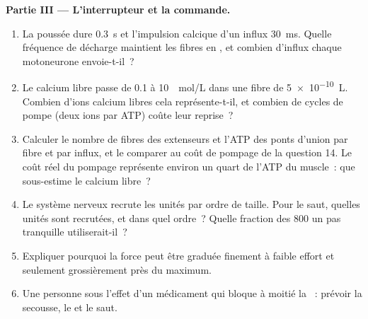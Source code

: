 \begin{problem}
\medskip
\noindent\textbf{Partie III --- L'interrupteur et la commande.}
\begin{enumerate}[resume]
  \item La poussée dure \qty{0.3}{s} et l'impulsion calcique d'un influx
        \qty{30}{ms}. Quelle fréquence de décharge maintient les fibres en
        , et combien d'influx chaque motoneurone envoie-t-il~?
  \item Le calcium libre passe de \qty{0.1}{} à \qty{10}{\micro
        mol/L} dans une fibre de \qty{5e-10}{L}. Combien d'ions calcium
        libres cela représente-t-il, et combien de cycles de pompe (deux
        ions par ATP) coûte leur reprise~?
  \item Calculer le nombre de fibres des extenseurs et l'ATP des ponts
        d'union par fibre et par influx, et le comparer au coût de pompage
        de la question 14. Le coût réel du pompage représente environ un
        quart de l'ATP du muscle~: que sous-estime le calcium libre~?
  \item Le système nerveux recrute les unités par ordre de taille. Pour
        le saut, quelles unités sont recrutées, et dans quel ordre~?
        Quelle fraction des \num{800} un pas tranquille utiliserait-il~?
  \item Expliquer pourquoi la force peut être graduée finement à faible
        effort et seulement grossièrement près du maximum.
  \item Une personne sous l'effet d'un médicament qui bloque à moitié
        la ~: prévoir la secousse, le  et
        le saut.
\end{enumerate}


\end{problem}
